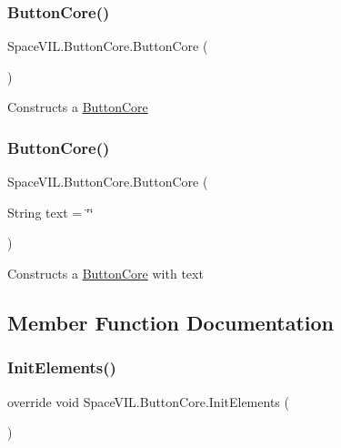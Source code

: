 \subsubsection{\texorpdfstring{Button\+Core()}{ButtonCore()}\hspace{0.1cm}{\footnotesize\ttfamily [1/2]}}
{\footnotesize\ttfamily Space\+V\+I\+L.\+Button\+Core.\+Button\+Core (\begin{DoxyParamCaption}{ }\end{DoxyParamCaption})}



Constructs a \mbox{\hyperlink{class_space_v_i_l_1_1_button_core}{Button\+Core}} 

\mbox{\label{class_space_v_i_l_1_1_button_core_af14e7efaa232a4ce2685fad35b6d691a}} 
\subsubsection{\texorpdfstring{Button\+Core()}{ButtonCore()}\hspace{0.1cm}{\footnotesize\ttfamily [2/2]}}
{\footnotesize\ttfamily Space\+V\+I\+L.\+Button\+Core.\+Button\+Core (\begin{DoxyParamCaption}\item[{String}]{text = {\ttfamily \char`\"{}\char`\"{}} }\end{DoxyParamCaption})}



Constructs a \mbox{\hyperlink{class_space_v_i_l_1_1_button_core}{Button\+Core}} with text 



\subsection{Member Function Documentation}
\mbox{\label{class_space_v_i_l_1_1_button_core_a4321848c2398d6e08da3bfea649e3e31}} 
\subsubsection{\texorpdfstring{Init\+Elements()}{InitElements()}}
{\footnotesize\ttfamily override void Space\+V\+I\+L.\+Button\+Core.\+Init\+Elements (\begin{DoxyParamCaption}{ }\end{DoxyParamCaption})\hspace{0.3cm}{\ttfamily [virtual]}}



